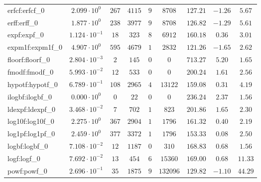 \begin{tabular}{|l|c|c|c|c|c|c|c|c|}
erfcf:erfcf\_0               & $ 2.099 \cdot 10^{0}  $ & $ 267    $ & $ 4115   $ & $ 9   $ & $ 8708   $ & $ 127.21      $ & $ -1.26   $ & $ 5.67    $ \\
erff:erff\_0                 & $ 1.877 \cdot 10^{0}  $ & $ 238    $ & $ 3977   $ & $ 9   $ & $ 8708   $ & $ 126.82      $ & $ -1.29   $ & $ 5.61    $ \\
expf:expf\_0                 & $ 1.124 \cdot 10^{-1} $ & $ 18     $ & $ 323    $ & $ 8   $ & $ 6912   $ & $ 160.18      $ & $ 0.36    $ & $ 3.01    $ \\
expm1f:expm1f\_0             & $ 4.907 \cdot 10^{0}  $ & $ 595    $ & $ 4679   $ & $ 1   $ & $ 2832   $ & $ 121.26      $ & $ -1.65   $ & $ 2.62    $ \\
floorf:floorf\_0             & $ 2.804 \cdot 10^{-3} $ & $ 2      $ & $ 145    $ & $ 0   $ & $ 0      $ & $ 713.27      $ & $ 5.20    $ & $ 1.65    $ \\
fmodf:fmodf\_0               & $ 5.993 \cdot 10^{-2} $ & $ 12     $ & $ 533    $ & $ 0   $ & $ 0      $ & $ 200.24      $ & $ 1.61    $ & $ 2.56    $ \\
hypotf:hypotf\_0             & $ 6.789 \cdot 10^{-1} $ & $ 108    $ & $ 2965   $ & $ 4   $ & $ 13122  $ & $ 159.08      $ & $ 0.31    $ & $ 4.19    $ \\
ilogbf:ilogbf\_0             & $ 0.000 \cdot 10^{0}  $ & $ 0      $ & $ 22     $ & $ 0   $ & $ 0      $ & $ 236.24      $ & $ 2.37    $ & $ 1.56    $ \\
ldexpf:ldexpf\_0             & $ 3.468 \cdot 10^{-2} $ & $ 7      $ & $ 702    $ & $ 1   $ & $ 823    $ & $ 201.86      $ & $ 1.65    $ & $ 2.30    $ \\
log10f:log10f\_0             & $ 2.275 \cdot 10^{0}  $ & $ 367    $ & $ 2904   $ & $ 1   $ & $ 1796   $ & $ 161.32      $ & $ 0.40    $ & $ 2.19    $ \\
log1pf:log1pf\_0             & $ 2.459 \cdot 10^{0}  $ & $ 377    $ & $ 3372   $ & $ 1   $ & $ 1796   $ & $ 153.33      $ & $ 0.08    $ & $ 2.50    $ \\
logbf:logbf\_0               & $ 7.108 \cdot 10^{-2} $ & $ 12     $ & $ 1187   $ & $ 0   $ & $ 310    $ & $ 168.83      $ & $ 0.68    $ & $ 1.56    $ \\
logf:logf\_0                 & $ 7.692 \cdot 10^{-2} $ & $ 13     $ & $ 454    $ & $ 6   $ & $ 15360  $ & $ 169.00      $ & $ 0.68    $ & $ 11.33   $ \\
powf:powf\_0                 & $ 2.696 \cdot 10^{-1} $ & $ 35     $ & $ 1875   $ & $ 9   $ & $ 132096 $ & $ 129.82      $ & $ -1.10   $ & $ 44.29   $ \\

\end{tabular}
